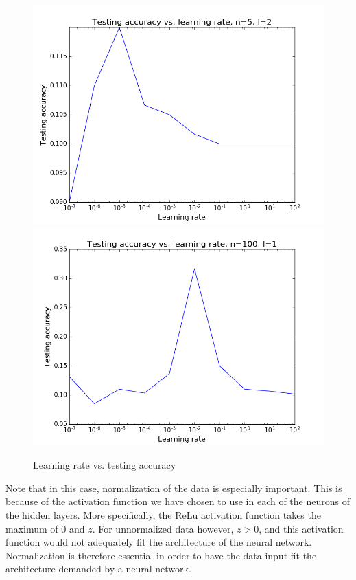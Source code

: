 \documentclass{article}
\begin{document}
\begin{figure}[width=\linewidth]
\centering
\begin{multicols}{2}
  \includegraphics[width=1.2\linewidth]{code/P1/accuracy_vs_learning_rate,mnist,(5,5).png}
  \includegraphics[width=1.2\linewidth]{code/P1/accuracy_vs_learning_rate,mnist,(100).png}
\end{multicols}
\caption{Learning rate vs. testing accuracy}
\end{figure}

Note that in this case, normalization of the data is especially important. This is because of the activation function we have chosen to use in each of the neurons of the hidden layers. More specifically, the ReLu activation function takes the maximum of 0 and $z$. For unnormalized data however, $z > 0$, and this activation function would not adequately fit the architecture of the neural network. Normalization is therefore essential in order to have the data input fit the architecture demanded by a neural network.
\end{document}
